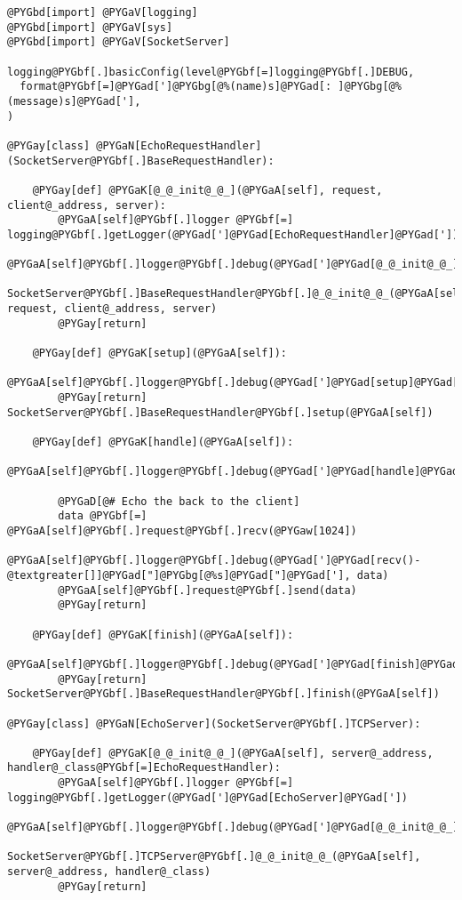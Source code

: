 \documentclass[a4paper,10pt,english]{manual}
\begin{document}
\begin{Verbatim}[commandchars=@\[\]]
@PYGbd[import] @PYGaV[logging]
@PYGbd[import] @PYGaV[sys]
@PYGbd[import] @PYGaV[SocketServer]

logging@PYGbf[.]basicConfig(level@PYGbf[=]logging@PYGbf[.]DEBUG,
  format@PYGbf[=]@PYGad[']@PYGbg[@%(name)s]@PYGad[: ]@PYGbg[@%(message)s]@PYGad['],
)

@PYGay[class] @PYGaN[EchoRequestHandler](SocketServer@PYGbf[.]BaseRequestHandler):

    @PYGay[def] @PYGaK[@_@_init@_@_](@PYGaA[self], request, client@_address, server):
        @PYGaA[self]@PYGbf[.]logger @PYGbf[=] logging@PYGbf[.]getLogger(@PYGad[']@PYGad[EchoRequestHandler]@PYGad['])
        @PYGaA[self]@PYGbf[.]logger@PYGbf[.]debug(@PYGad[']@PYGad[@_@_init@_@_]@PYGad['])
        SocketServer@PYGbf[.]BaseRequestHandler@PYGbf[.]@_@_init@_@_(@PYGaA[self], request, client@_address, server)
        @PYGay[return]

    @PYGay[def] @PYGaK[setup](@PYGaA[self]):
        @PYGaA[self]@PYGbf[.]logger@PYGbf[.]debug(@PYGad[']@PYGad[setup]@PYGad['])
        @PYGay[return] SocketServer@PYGbf[.]BaseRequestHandler@PYGbf[.]setup(@PYGaA[self])

    @PYGay[def] @PYGaK[handle](@PYGaA[self]):
        @PYGaA[self]@PYGbf[.]logger@PYGbf[.]debug(@PYGad[']@PYGad[handle]@PYGad['])

        @PYGaD[@# Echo the back to the client]
        data @PYGbf[=] @PYGaA[self]@PYGbf[.]request@PYGbf[.]recv(@PYGaw[1024])
        @PYGaA[self]@PYGbf[.]logger@PYGbf[.]debug(@PYGad[']@PYGad[recv()-@textgreater[]]@PYGad["]@PYGbg[@%s]@PYGad["]@PYGad['], data)
        @PYGaA[self]@PYGbf[.]request@PYGbf[.]send(data)
        @PYGay[return]

    @PYGay[def] @PYGaK[finish](@PYGaA[self]):
        @PYGaA[self]@PYGbf[.]logger@PYGbf[.]debug(@PYGad[']@PYGad[finish]@PYGad['])
        @PYGay[return] SocketServer@PYGbf[.]BaseRequestHandler@PYGbf[.]finish(@PYGaA[self])

@PYGay[class] @PYGaN[EchoServer](SocketServer@PYGbf[.]TCPServer):

    @PYGay[def] @PYGaK[@_@_init@_@_](@PYGaA[self], server@_address, handler@_class@PYGbf[=]EchoRequestHandler):
        @PYGaA[self]@PYGbf[.]logger @PYGbf[=] logging@PYGbf[.]getLogger(@PYGad[']@PYGad[EchoServer]@PYGad['])
        @PYGaA[self]@PYGbf[.]logger@PYGbf[.]debug(@PYGad[']@PYGad[@_@_init@_@_]@PYGad['])
        SocketServer@PYGbf[.]TCPServer@PYGbf[.]@_@_init@_@_(@PYGaA[self], server@_address, handler@_class)
        @PYGay[return]


\end{Verbatim}
\end{document}
